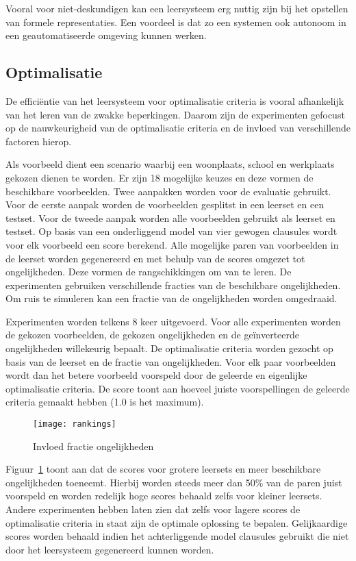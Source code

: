 Vooral voor niet-deskundigen kan een leersysteem erg nuttig zijn bij het opstellen van formele representaties.
Een voordeel is dat zo een systemen ook autonoom in een geautomatiseerde omgeving kunnen werken.

\subsection{Optimalisatie}
De effici\"entie van het leersysteem voor optimalisatie criteria is vooral afhankelijk van het leren van de zwakke beperkingen.
Daarom zijn de experimenten gefocust op de nauwkeurigheid van de optimalisatie criteria en de invloed van verschillende factoren hierop.

Als voorbeeld dient een scenario waarbij een woonplaats, school en werkplaats gekozen dienen te worden.
Er zijn 18 mogelijke keuzes en deze vormen de beschikbare voorbeelden.
Twee aanpakken worden voor de evaluatie gebruikt.
Voor de eerste aanpak worden de voorbeelden gesplitst in een leerset en een testset.
Voor de tweede aanpak worden alle voorbeelden gebruikt als leerset en testset.
Op basis van een onderliggend model van vier gewogen clausules wordt voor elk voorbeeld een score berekend.
Alle mogelijke paren van voorbeelden in de leerset worden gegenereerd en met behulp van de scores omgezet tot ongelijkheden.
Deze vormen de rangschikkingen om van te leren.
De experimenten gebruiken verschillende fracties van de beschikbare ongelijkheden.
Om ruis te simuleren kan een fractie van de ongelijkheden worden omgedraaid.

Experimenten worden telkens 8 keer uitgevoerd.
Voor alle experimenten worden de gekozen voorbeelden, de gekozen ongelijkheden en de ge\"inverteerde ongelijkheden willekeurig bepaalt.
De optimalisatie criteria worden gezocht op basis van de leerset en de fractie van ongelijkheden.
Voor elk paar voorbeelden wordt dan het betere voorbeeld voorspeld door de geleerde en eigenlijke optimalisatie criteria.
De score toont aan hoeveel juiste voorspellingen de geleerde criteria gemaakt hebben (1.0 is het maximum). 

\begin{figure}

  \centering
    \texttt{[image: rankings]}
  \caption{Invloed fractie ongelijkheden}
  \label{fig:fractie}

\end{figure}

Figuur~\ref{fig:fractie} toont aan dat de scores voor grotere leersets en meer beschikbare ongelijkheden toeneemt.
Hierbij worden steeds meer dan 50\% van de paren juist voorspeld en worden redelijk hoge scores behaald zelfs voor kleiner leersets.
Andere experimenten hebben laten zien dat zelfs voor lagere scores de optimalisatie criteria in staat zijn de optimale oplossing te bepalen.
Gelijkaardige scores worden behaald indien het achterliggende model clausules gebruikt die niet door het leersysteem gegenereerd kunnen worden.

